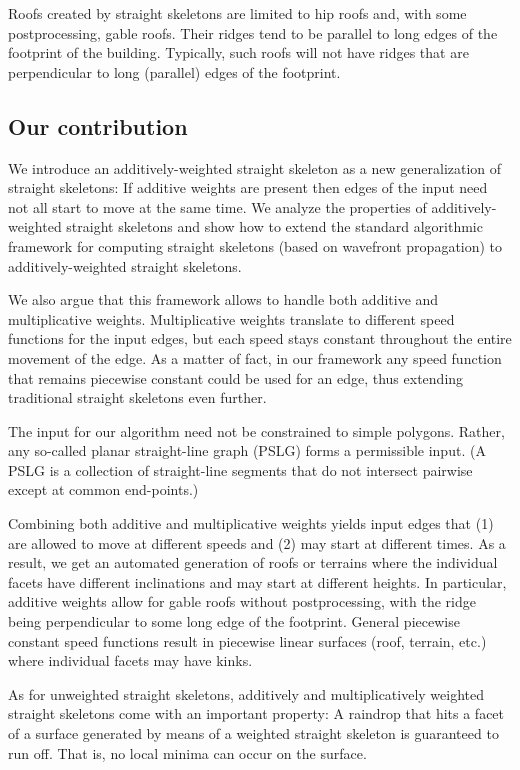 \documentclass[preprint]{elsarticle}
\begin{document}
Roofs created by straight skeletons are limited to hip roofs and, with some
postprocessing, gable roofs. Their ridges tend to be parallel to long
edges of the footprint of the building. Typically, such roofs will not have
ridges that are perpendicular to long (parallel) edges of the footprint.


\subsection{Our contribution}

We introduce an additively-weighted straight skeleton as a new
generalization of straight skeletons: If additive weights are present then
edges of the input need not all start to move at the same time.  We analyze
the properties of additively-weighted straight skeletons and show how to
extend the standard algorithmic framework for computing straight skeletons
(based on wavefront propagation) to additively-weighted straight skeletons.

We also argue that this framework allows to handle both additive and
multiplicative weights.
Multiplicative weights translate to different speed functions for the input
edges, but each speed stays constant throughout the entire movement of the
edge. As a matter of fact, in our framework any speed function that remains
piecewise constant could be used for an edge, thus extending traditional
straight skeletons even further.

The input for our algorithm need not be constrained to simple
polygons. Rather, any so-called planar straight-line graph (PSLG) forms a
permissible input. (A PSLG is a collection of straight-line segments that do
not intersect pairwise except at common end-points.)

Combining both additive and multiplicative weights yields input edges
that (1) are allowed to move at different speeds and (2) may start at
different times.  As a result, we get an automated generation of roofs
or terrains where the individual facets have different inclinations
and may start at different heights.  In particular, additive weights
allow for gable roofs without postprocessing, with the ridge being
perpendicular to some long edge of the footprint. General piecewise
constant speed functions result in piecewise linear surfaces (roof,
terrain, etc.) where individual facets may have kinks.

As for unweighted straight skeletons, additively and multiplicatively
weighted straight skeletons come with an important property: A
raindrop that hits a facet of a surface generated by means of a
weighted straight skeleton is guaranteed to run off. That is, no local
minima can occur on the surface.
\end{document}
